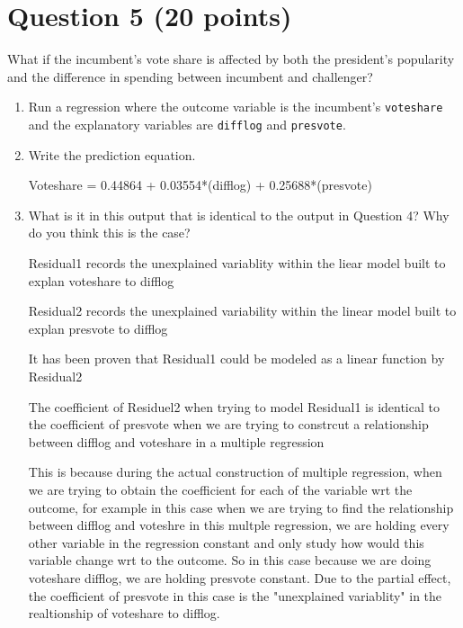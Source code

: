 \documentclass[12pt,letterpaper]{article}
\begin{document}
\section*{Question 5 (20 points)}
\noindent What if the incumbent's vote share is affected by both the president's popularity and the difference in spending between incumbent and challenger? 
	\begin{enumerate}
		\item Run a regression where the outcome variable is the incumbent's \texttt{voteshare} and the explanatory variables are \texttt{difflog} and \texttt{presvote}.	
		
			
		
		
		
		
		\item Write the prediction equation.	
		
		Voteshare = 0.44864 + 0.03554*(difflog) + 0.25688*(presvote)
		
		
		\item What is it in this output that is identical to the output in Question 4? Why do you think this is the case?
	
	Residual1 records the unexplained variablity within the liear model built to explan voteshare to  difflog
	
	Residual2 records the unexplained variability within the linear model built to explan presvote to difflog
	
	It has been proven that Residual1 could be modeled as a linear function by Residual2
	
	The coefficient of Residuel2 when trying to model Residual1  is identical to the coefficient of presvote when we are trying to constrcut a relationship between difflog and voteshare in a multiple regression
	
	This is because during the actual construction of multiple regression, when we are trying to obtain the coefficient for each of the variable wrt the outcome, for example in this case when we are trying to find the relationship between difflog and voteshre in this multple regression, we are holding every other variable in the regression constant and only study how would this variable change wrt to the outcome. So in this case because we are doing voteshare  difflog, we are holding presvote constant. Due to the partial effect, the coefficient of presvote in this case is the "unexplained variablity" in the realtionship of voteshare to difflog. 
	
	
	
	
	
	\end{enumerate}
\end{document}
